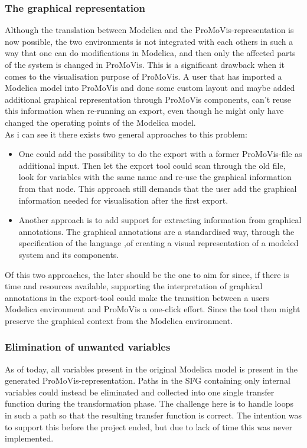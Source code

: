 \subsubsection{The graphical representation}
Although the translation between Modelica and the ProMoVis-representation is now possible, the two environments is not integrated with each others in such a way that one can do modifications in Modelica, and then only the affected parts of the system is changed in ProMoVis. This is a significant drawback when it comes to the visualisation purpose of ProMoVis. A user that has imported a Modelica model into ProMoVis and done some custom layout and maybe added additional graphical representation through ProMoVis components, can't reuse this information when re-running an export, even though he might only have changed the operating points of the Modelica model.\\\newline As i can see it there exists two general approaches to this problem: 
\begin{itemize}
\item One could add the possibility to do the export with a former ProMoVis-file as additional input. Then let the export tool could scan through the old file, look for variables with the same name and re-use the graphical information from that node. This approach still demands that the user add the graphical information needed for visualisation after the first export.
\item Another approach is to add support for extracting information from graphical annotations. The graphical annotations are a standardised way, through the specification of the language \cite{ModelicaSpec}\nocite{*},of creating a visual representation of a modeled system and its components.
\end{itemize}Of this two approaches, the later should be the one to aim for since, if there is time and resources available, supporting the interpretation of graphical annotations in the export-tool could make the transition between a users Modelica environment and ProMoVis a one-click effort. Since the tool then might preserve the graphical context from the Modelica environment.
\subsubsection{Elimination of unwanted variables}
As of today, all variables present in the original Modelica model is present in the generated ProMoVis-representation. Paths in the SFG containing only internal variables could instead be eliminated and collected into one single transfer function during the transformation phase. The challenge here is to handle loops in such a path so that the resulting transfer function is correct. The intention was to support this before the project ended, but due to lack of time this was never implemented. 

